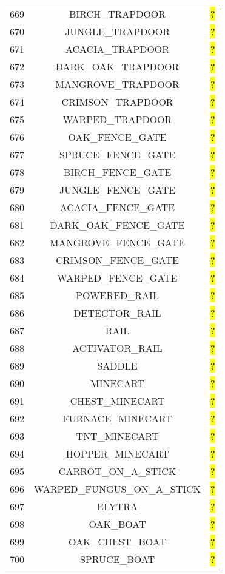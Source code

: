 \documentclass[11pt]{article}
\newcommand\myworries[1]{\sethlcolor{red}\hl{#1}}
\begin{document}
\begin{longtable}{ |c|c|c| }
669 & BIRCH\_TRAPDOOR & \myworries{?} \\
670 & JUNGLE\_TRAPDOOR & \myworries{?} \\
671 & ACACIA\_TRAPDOOR & \myworries{?} \\
672 & DARK\_OAK\_TRAPDOOR & \myworries{?} \\
673 & MANGROVE\_TRAPDOOR & \myworries{?} \\
674 & CRIMSON\_TRAPDOOR & \myworries{?} \\
675 & WARPED\_TRAPDOOR & \myworries{?} \\
676 & OAK\_FENCE\_GATE & \myworries{?} \\
677 & SPRUCE\_FENCE\_GATE & \myworries{?} \\
678 & BIRCH\_FENCE\_GATE & \myworries{?} \\
679 & JUNGLE\_FENCE\_GATE & \myworries{?} \\
680 & ACACIA\_FENCE\_GATE & \myworries{?} \\
681 & DARK\_OAK\_FENCE\_GATE & \myworries{?} \\
682 & MANGROVE\_FENCE\_GATE & \myworries{?} \\
683 & CRIMSON\_FENCE\_GATE & \myworries{?} \\
684 & WARPED\_FENCE\_GATE & \myworries{?} \\
685 & POWERED\_RAIL & \myworries{?} \\
686 & DETECTOR\_RAIL & \myworries{?} \\
687 & RAIL & \myworries{?} \\
688 & ACTIVATOR\_RAIL & \myworries{?} \\
689 & SADDLE & \myworries{?} \\
690 & MINECART & \myworries{?} \\
691 & CHEST\_MINECART & \myworries{?} \\
692 & FURNACE\_MINECART & \myworries{?} \\
693 & TNT\_MINECART & \myworries{?} \\
694 & HOPPER\_MINECART & \myworries{?} \\
695 & CARROT\_ON\_A\_STICK & \myworries{?} \\
696 & WARPED\_FUNGUS\_ON\_A\_STICK & \myworries{?} \\
697 & ELYTRA & \myworries{?} \\
698 & OAK\_BOAT & \myworries{?} \\
699 & OAK\_CHEST\_BOAT & \myworries{?} \\
700 & SPRUCE\_BOAT & \myworries{?} \\

\end{longtable}
\end{document}
